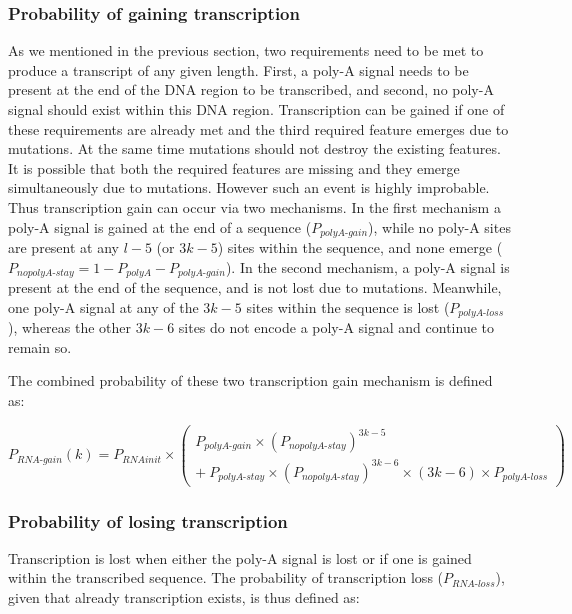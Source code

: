 \documentclass[12pt,a4paper]{article}
\newcommand{\cmnt}[1]{{\color{purple} #1}}
\begin{document}
\subsubsection{Probability of gaining transcription}

\cmnt{As we mentioned in the previous section, two requirements need to be met to produce a transcript of any given length. First, a poly-A signal needs to be present at the end of the DNA region to be transcribed, and second, no poly-A signal should exist within this DNA region. Transcription can be gained if one of these requirements are already met and the third required feature emerges due to mutations. At the same time mutations should not destroy the existing features. It is possible that both the required features are missing and they emerge simultaneously due to mutations. However such an event is highly improbable. Thus transcription gain can occur via two mechanisms. In the first mechanism a poly-A signal is gained at the end of a sequence ($P_\textit{polyA-gain}$), while no poly-A sites are present at any $l-5$ (or $3k-5$) sites within the sequence, and none emerge ($P_\textit{nopolyA-stay} = 1 - P_\textit{polyA} - P_\textit{polyA-gain}$). In the second mechanism, a poly-A signal is present at the end of the sequence, and is not lost due to mutations. Meanwhile, one poly-A signal at any of the $3k-5$ sites within the sequence is lost ($P_\textit{polyA-loss}$), whereas the other $3k-6$ sites do not encode a poly-A signal and continue to remain so.

The combined probability of these two transcription gain mechanism is defined as:

\begin{equation}
P_\textit{RNA-gain}(k) = P_\textit{RNAinit} \times \begin{pmatrix}
P_\textit{polyA-gain}\times (P_\textit{nopolyA-stay})^{3k-5} \\[1em]
 +\  P_\textit{polyA-stay}\times (P_\textit{nopolyA-stay})^{3k-6} \times (3k-6) \times P_\textit{polyA-loss}
\end{pmatrix}  
\label{eqrnagain}
\end{equation}

\subsubsection{Probability of losing transcription}

Transcription is lost when either the poly-A signal is lost or if one is gained within the transcribed sequence. The probability of transcription loss ($P_\textit{RNA-loss}$), given that already transcription exists, is thus defined as:

}
\end{document}
